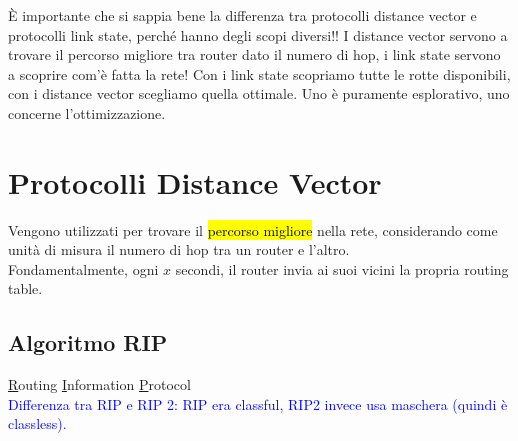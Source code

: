 \noindent È importante che si sappia bene la differenza tra protocolli distance vector e protocolli link state, perché hanno degli scopi diversi!! I distance vector servono a trovare il percorso migliore tra router dato il numero di hop, i link state servono a scoprire com'è fatta la rete! Con i link state scopriamo tutte le rotte disponibili, con i distance vector scegliamo quella ottimale. Uno è puramente esplorativo, uno concerne l'ottimizzazione.\\

\section*{Protocolli Distance Vector}
\noindent Vengono utilizzati per trovare il \hl{percorso migliore} nella rete, considerando come unità di misura il numero di hop tra un router e l'altro.\\

\noindent Fondamentalmente, ogni $x$ secondi, il router invia ai suoi vicini la propria routing table.\\
\subsection*{Algoritmo RIP}
\noindent \underline{R}outing \underline{I}nformation \underline{P}rotocol\\

\noindent\textcolor{Blue}{Differenza tra RIP e RIP 2: RIP era classful, RIP2 invece usa maschera (quindi è classless).}

